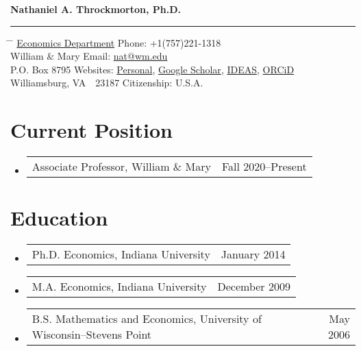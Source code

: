 \documentclass[10pt,letterpaper,en-US]{article}
\makeatletter
\newcommand{\name}{Nathaniel A. Throckmorton, Ph.D.}
\newcommand{\itemrow}[2]
{\begin{tabular*}{\linewidth}{l@{\extracolsep{\fill}}r}
	#1 & #2 \\
\end{tabular*}}
\makeatother
\begin{document}

{\Large \textbf{\name}}
\vspace{4pt}
\hrule
\vspace{-4pt}
\begin{tabbing}
    \hspace{3.25in}         	\=  \hspace{3.25in}  \= \kill
    \href{https://www.wm.edu/as/economics/}{Economics Department} 	\>  Phone: +1(757)221-1318                     \\
    William \& Mary             \>  Email: \href{mailto:nat@wm.edu}{nat@wm.edu}          \\
    P.O. Box 8795  				\>  Websites: \href{https://nathrockmorton.people.wm.edu/}{Personal}, \href{https://scholar.google.com/citations?user=OYdRwzYAAAAJ}{Google Scholar}, \href{https://ideas.repec.org/f/pth237.html}{IDEAS}, \href{https://orcid.org/0000-0002-9671-757X}{ORCiD} \\
    Williamsburg, VA~~23187	    \>  Citizenship: U.S.A.
\end{tabbing}

\section*{Current Position}
\begin{itemize}
	\item \itemrow{Associate Professor, William \& Mary}{Fall 2020--Present}
\end{itemize}

\section*{Education}
\begin{itemize}
	\item
    \itemrow{Ph.D. Economics, Indiana University}{January 2014}
	\item
    \itemrow{M.A. Economics, Indiana University}{December 2009}
	\item
    \itemrow{B.S. Mathematics and Economics, University of Wisconsin--Stevens Point}{May 2006}
\end{itemize}
\end{document}
